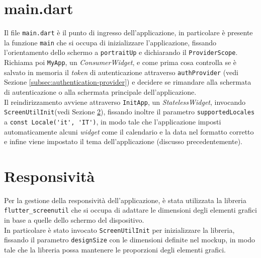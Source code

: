 \section{main.dart}
\label{sec:main}

Il file \lstinline{main.dart} è il punto di ingresso dell'applicazione, in particolare è presente la funzione \lstinline{main} che si occupa di inizializzare l'applicazione, fissando l'orientamento dello schermo a \lstinline{portraitUp} e dichiarando il \lstinline{ProviderScope}. \\
Richiama poi \lstinline{MyApp}, un \emph{ConsumerWidget}, e come prima cosa controlla se è salvato in memoria il \emph{token} di autenticazione attraverso \lstinline{authProvider} (vedi Sezione \ref{subsec:authentication-provider}) e decidere se rimandare alla schermata di autenticazione o alla schermata principale dell'applicazione. \\
Il reindirizzamento avviene attraverso \lstinline{InitApp}, un \emph{StatelessWidget}, invocando \lstinline{ScreenUtilInit}(vedi Sezione \ref{sec:responsivity}), fissando inoltre il parametro \lstinline{supportedLocales} a \lstinline{const Locale('it', 'IT')}, in modo tale che l'applicazione imposti automaticamente alcuni \emph{widget} come il calendario e la data nel formatto corretto e infine viene impostato il tema dell'applicazione (discusso precedentemente).

\section{Responsività}
\label{sec:responsivity}

Per la gestione della responsività dell'applicazione, è stata utilizzata la libreria \lstinline{flutter_screenutil} \cite{site:screenutil} che si occupa di adattare le dimensioni degli elementi grafici in base a quelle dello schermo del dispositivo. \\
In particolare è stato invocato \lstinline{ScreenUtilInit} per inizializzare la libreria, fissando il parametro \lstinline{designSize} con le dimensioni definite nel \gls{mockup}\glsoccur, in modo tale che la libreria possa mantenere le proporzioni degli elementi grafici. 



